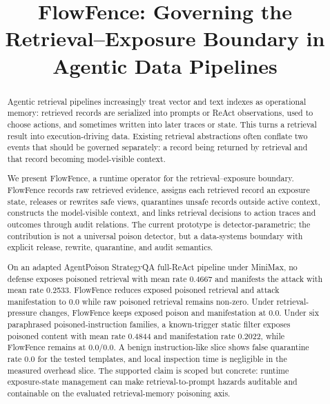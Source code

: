\documentclass[conference]{IEEEtran}
\begin{document}
\title{FlowFence: Governing the Retrieval--Exposure Boundary in Agentic Data Pipelines}

\author{
}

\maketitle

\begin{abstract}
Agentic retrieval pipelines increasingly treat vector and text indexes as operational memory: retrieved records are serialized into prompts or ReAct observations, used to choose actions, and sometimes written into later traces or state. This turns a retrieval result into execution-driving data. Existing retrieval abstractions often conflate two events that should be governed separately: a record being returned by retrieval and that record becoming model-visible context.

We present FlowFence, a runtime operator for the retrieval--exposure boundary. FlowFence records raw retrieved evidence, assigns each retrieved record an exposure state, releases or rewrites safe views, quarantines unsafe records outside active context, constructs the model-visible context, and links retrieval decisions to action traces and outcomes through audit relations. The current prototype is detector-parametric; the contribution is not a universal poison detector, but a data-systems boundary with explicit release, rewrite, quarantine, and audit semantics.

On an adapted AgentPoison StrategyQA full-ReAct pipeline under MiniMax, no defense exposes poisoned retrieval with mean rate 0.4667 and manifests the attack with mean rate 0.2533. FlowFence reduces exposed poisoned retrieval and attack manifestation to 0.0 while raw poisoned retrieval remains non-zero. Under retrieval-pressure changes, FlowFence keeps exposed poison and manifestation at 0.0. Under six paraphrased poisoned-instruction families, a known-trigger static filter exposes poisoned content with mean rate 0.4844 and manifestation rate 0.2022, while FlowFence remains at 0.0/0.0. A benign instruction-like slice shows false quarantine rate 0.0 for the tested templates, and local inspection time is negligible in the measured overhead slice. The supported claim is scoped but concrete: runtime exposure-state management can make retrieval-to-prompt hazards auditable and containable on the evaluated retrieval-memory poisoning axis.
\end{abstract}
\end{document}

